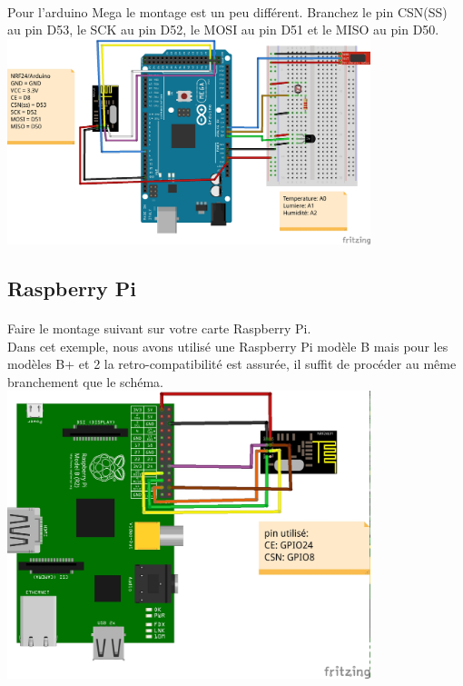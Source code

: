 \documentclass[a4paper, titlepage, oneside, 12pt]{article}%
\begin{document}
\paragraph{}
Pour l'arduino Mega le montage est un peu différent.
Branchez le pin CSN(SS) au pin D53, le SCK au pin D52, le MOSI au pin D51 et le MISO au pin D50.
\newline
\\
\includegraphics[width=400px] {montage-arduino-mega-nrF24.jpg}

\subsection{Raspberry Pi}
\paragraph{}
Faire le montage suivant sur votre carte Raspberry Pi.\\ Dans cet exemple, nous avons utilisé une Raspberry Pi modèle B mais pour les modèles B+ et 2 la retro-compatibilité est assurée, il suffit de procéder au même branchement que le schéma.
\newline
\\
\includegraphics[width=400px] {montage-raspberry-nrF24.jpg}
\end{document}
